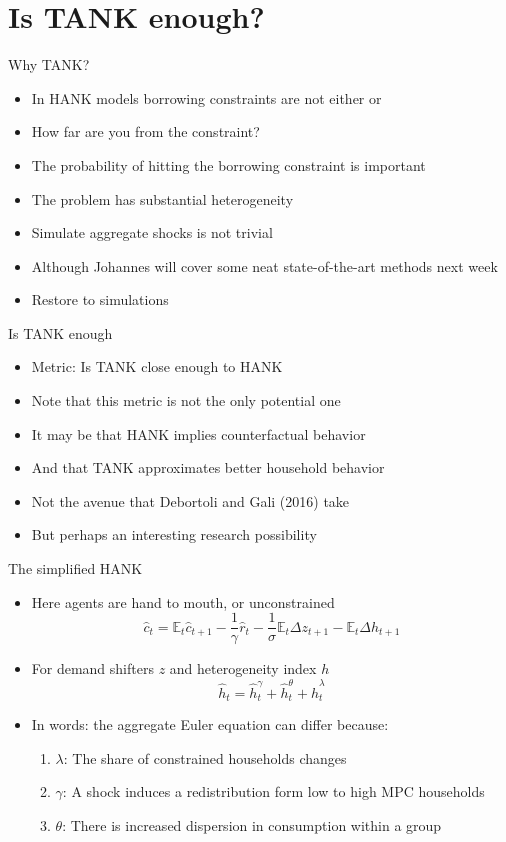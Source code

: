 \documentclass[english,xcolor=svgnames]{beamer}
\begin{document}
\section{Is TANK enough?}

\begin{frame}{Why TANK?}
\begin{itemize}
\item In HANK models borrowing constraints are not either or
\item How far are you from the constraint?
\item The probability of hitting the borrowing constraint is important
\item The problem has substantial heterogeneity
\item Simulate aggregate shocks is not trivial
\item Although Johannes will cover some neat state-of-the-art methods next week
\item Restore to simulations
\end{itemize}
\end{frame}

\begin{frame}{Is TANK enough}
\begin{itemize}
\item Metric: Is TANK close enough to HANK
\item Note that this metric is not the only potential one
\item It may be that HANK implies counterfactual behavior
\item And that TANK approximates better household behavior
\item Not the avenue that Debortoli and Gali (2016) take
\item But perhaps an interesting research possibility
\end{itemize}
\end{frame}




\begin{frame}{The simplified HANK}
\begin{itemize}
\item Here agents are hand to mouth, or unconstrained
\[\hat{c}_t = \mathbb{E}_t \hat{c}_{t+1} - \frac{1}{\gamma} \hat{r}_t - \frac{1}{\sigma}\mathbb{E}_t \Delta z_{t+1} - \mathbb{E}_t \Delta \hat{h}_{t+1}\]
\item For demand shifters $z$ and heterogeneity index $h$
\[\hat{h}_t = \hat{h}^{\gamma}_t + \hat{h}^{\theta}_t + \hat{h}^{\lambda}_t\]
\item In words: the aggregate Euler equation can differ because:
\begin{enumerate}
\item $\lambda$: The share of constrained households changes 
\item $\gamma$: A shock induces a redistribution form low to high MPC households
\item $\theta$: There is increased dispersion in consumption within a group
\end{enumerate}
\end{itemize}
\end{frame}
\end{document}
